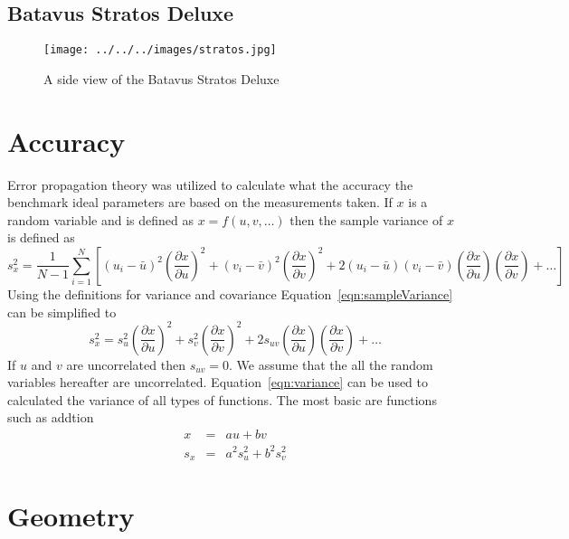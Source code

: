 \documentclass{bmd2010p}
\begin{document}
\subsection{Batavus Stratos Deluxe}
\begin{figure}[htbp]
    \begin{center}
        \texttt{[image: ../../../images/stratos.jpg]}
    \end{center}
    \caption{A side view of the Batavus Stratos Deluxe}
    \label{fig:stratos}
\end{figure}
\section{Accuracy}
Error propagation theory was utilized to calculate what the accuracy the
benchmark ideal parameters are based on the measurements taken. If $x$ is a
random variable and is defined as $x=f(u,v,\ldots)$ then the sample variance of
$x$ is defined as
\begin{equation}
    s_x^2 = \frac{1}{N-1}\sum^N_{i=1}
    \left[(u_i - \bar{u})^2\left(\frac{\partial x}{\partial u}\right)^2 +
    (v_i - \bar{v})^2\left(\frac{\partial x}{\partial v}\right)^2 +
    2(u_i - \bar{u})(v_i - \bar{v})\left(\frac{\partial x}{\partial u}\right)\left(\frac{\partial x}{\partial v}\right)
    + \ldots\right]
    \label{eqn:sampleVariance}
\end{equation}
Using the definitions for variance and covariance
Equation~\ref{eqn:sampleVariance} can be simplified to
\begin{equation}
    s_x^2 = s_u^2\left(\frac{\partial x}{\partial u}\right)^2 +
            s_v^2\left(\frac{\partial x}{\partial v}\right)^2 +
            2s_{uv}\left(\frac{\partial x}{\partial u}\right)\left(\frac{\partial x}{\partial v}\right)
            + \ldots
    \label{eqn:variance}
\end{equation}
If $u$ and $v$ are uncorrelated then $s_{uv}=0$. We assume that the all the
random variables hereafter are uncorrelated. Equation~\ref{eqn:variance} can be
used to calculated the variance of all types of functions. The most basic are
functions such as addtion
\begin{eqnarray}
    \label{eqn:addition}
    x &=&  au + bv\\
    s_x &=& a^2s_u^2 + b^2s_v^2
\end{eqnarray}

\section{Geometry}
\end{document}
